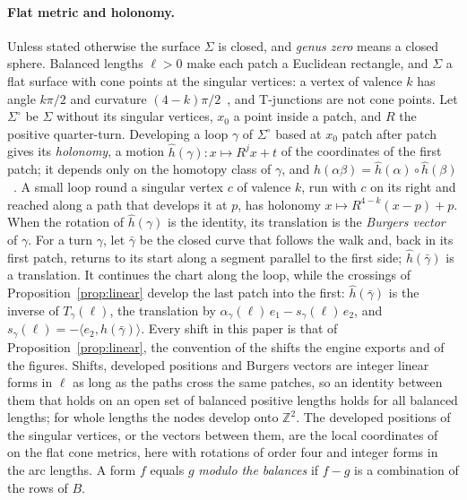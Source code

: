 \documentclass[11pt,a4paper]{article}
\newcommand{\Z}{\mathbb{Z}}
\newcommand{\shift}{s}
\begin{document}
\paragraph{Flat metric and holonomy.}
Unless stated otherwise the surface $\Sigma$ is closed, and \emph{genus zero}
means a closed sphere. Balanced lengths $\ell > 0$ make each patch a
Euclidean rectangle, and $\Sigma$ a flat surface with cone points at the
singular vertices: a vertex of valence $k$ has angle $k\pi/2$ and curvature
$(4-k)\pi/2$~\cite{troyanov1986surfaces}, and T-junctions are not cone points. Let $\Sigma^\circ$ be $\Sigma$ without its singular vertices,
$x_0$ a point inside a patch, and $R$ the positive quarter-turn. Developing a
loop $\gamma$ of $\Sigma^\circ$ based at $x_0$ patch after patch gives its
\emph{holonomy}, a motion $\hat h(\gamma)\colon x \mapsto R^j x + t$ of the
coordinates of the first patch; it depends only on the homotopy class of
$\gamma$, and $\hat h(\alpha\beta) = \hat h(\alpha) \circ \hat
h(\beta)$~\cite{izmestiev2013torus}. A small loop round a singular vertex $c$
of valence $k$, run with $c$ on its right and reached along a path that
develops it at $p$, has holonomy $x \mapsto R^{4-k}(x - p) + p$. When the
rotation of $\hat h(\gamma)$ is the identity, its translation is the
\emph{Burgers vector} of $\gamma$. For a turn $\gamma$, let $\bar\gamma$ be
the closed curve that follows the walk and, back in its first patch, returns
to its start along a segment parallel to the first side; $\hat
h(\bar\gamma)$ is a translation. It continues the chart along the loop,
while the crossings of Proposition~\ref{prop:linear} develop the last patch
into the first: $\hat h(\bar\gamma)$ is the inverse of $T_\gamma(\ell)$, the
translation by $\alpha_\gamma(\ell)\, e_1 - \shift_\gamma(\ell)\, e_2$, and
$\shift_\gamma(\ell) = -\langle e_2, \hat h(\bar\gamma) \rangle$. Every shift
in this paper is that of Proposition~\ref{prop:linear}, the convention of the
shifts the engine exports and of the figures. Shifts, developed positions and Burgers vectors are
integer linear forms in $\ell$ as long as the paths cross the same patches, so
an identity between them that holds on an open set of balanced positive
lengths holds for all balanced lengths; for whole lengths the nodes develop
onto $\Z^2$. The developed positions of the singular vertices, or the vectors
between them, are the local coordinates of~\cite{thurston1998shapes} on the
flat cone metrics, here with rotations of order four and integer forms in the
arc lengths. A form $f$ equals $g$ \emph{modulo the balances} if $f - g$ is a
combination of the rows of $B$.
\end{document}

